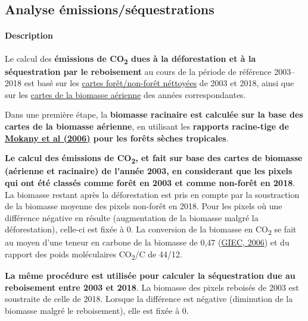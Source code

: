 \documentclass[a4paper, notitlepage, 12pt, krantz2]{krantz}
\let\oldparagraph\paragraph
\renewcommand{\paragraph}[1]{\oldparagraph{#1}\mbox{}}
\begin{document}
\hypertarget{analyse-emissionssequestrations}{%
\subsection{Analyse émissions/séquestrations}\label{analyse-emissionssequestrations}}

\hypertarget{description-2}{%
\paragraph{Description}\label{description-2}}

Le calcul des \textbf{émissions de CO\textsubscript{2} dues à la déforestation et à la séquestration par le reboisement} au cours de la période de référence 2003--2018 est basé sur les \protect\hyperlink{NRF-clean-fc-maps}{cartes forêt/non-forêt néttoyées} de 2003 et 2018, ainsi que sur les \protect\hyperlink{NRF-agb-maps}{cartes de la biomasse aérienne} des années correspondantes.

Dans une première étape, la \textbf{biomasse racinaire est calculée sur la base des cartes de la biomasse aérienne}, en utilisant les \textbf{rapports racine-tige de \href{https://onlinelibrary.wiley.com/doi/abs/10.1111/j.1365-2486.2005.001043.x}{Mokany et al (2006)} pour les forêts sèches tropicales}.

\textbf{Le calcul des émissions de CO\textsubscript{2}, et fait sur base des cartes de biomasse (aérienne et racinaire) de l'année 2003, en considerant que les pixels qui ont été classés comme forêt en 2003 et comme non-forêt en 2018}. La biomasse restant après la déforestation est pris en compte par la soustraction de la biomasse moyenne des pixels non-forêt en 2018. Pour les pixels où une différence négative en résulte (augmentation de la biomasse malgré la déforestation), celle-ci est fixée à 0. La conversion de la biomasse en CO\textsubscript{2} se fait au moyen d'une teneur en carbone de la biomasse de 0,47 (\href{https://www.ipcc-nggip.iges.or.jp/public/2006gl/pdf/4_Volume4/V4_04_Ch4_Forest_Land.pdf\#page=48}{GIEC, 2006}) et du rapport des poids moléculaires CO\textsubscript{2}/C de 44/12.

\textbf{La même procédure est utilisée pour calculer la séquestration due au reboisement entre 2003 et 2018}. La biomasse des pixels reboisés de 2003 est soustraite de celle de 2018. Lorsque la différence est négative (diminution de la biomasse malgré le reboisement), elle est fixée à 0.
\end{document}
